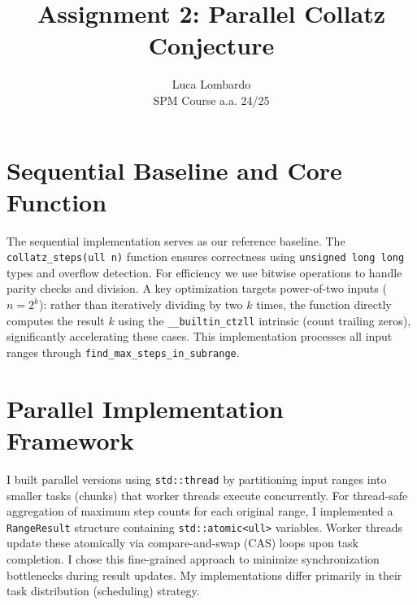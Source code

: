 \documentclass[10pt]{article}
\title{Assignment 2: Parallel Collatz Conjecture}
\author{Luca Lombardo \\ SPM Course a.a. 24/25}
\date{}
\newcommand{\code}[1]{\texttt{#1}}
\begin{document}
\maketitle
\vspace{-1.5em}

\section{Sequential Baseline and Core Function}
The sequential implementation serves as our reference baseline. The \code{collatz\_steps(ull n)} function ensures correctness using \code{unsigned long long} types and overflow detection. For efficiency we use bitwise operations to handle parity checks and division. A key optimization targets power-of-two inputs ($n=2^k$): rather than iteratively dividing by two $k$ times, the function directly computes the result $k$ using the \code{\_\_builtin\_ctzll} intrinsic (count trailing zeros), significantly accelerating these cases. This implementation processes all input ranges through \code{find\_max\_steps\_in\_subrange}.

\section{Parallel Implementation Framework}
I built parallel versions using \code{std::thread} by partitioning input ranges into smaller tasks (chunks) that worker threads execute concurrently. For thread-safe aggregation of maximum step counts for each original range, I implemented a \code{RangeResult} structure containing \code{std::atomic<ull>} variables. Worker threads update these atomically via compare-and-swap (CAS) loops upon task completion. I chose this fine-grained approach to minimize synchronization bottlenecks during result updates. My implementations differ primarily in their task distribution (scheduling) strategy.
\end{document}
